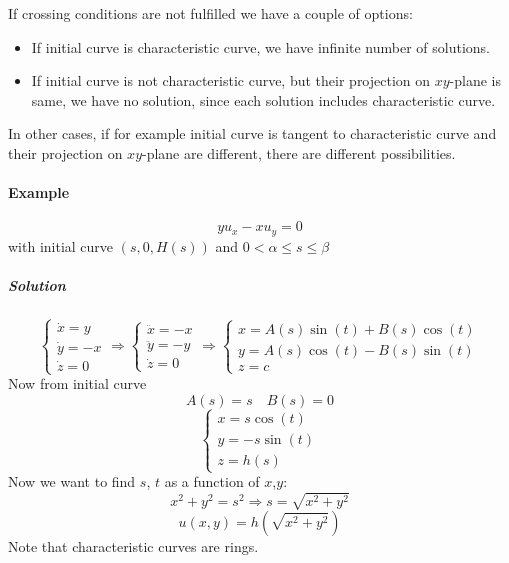 If crossing conditions are not fulfilled we have a couple of options:
\begin{itemize}
	\item If initial curve is characteristic curve, we have infinite number of solutions.
	\item If initial curve is not characteristic curve, but their projection on $xy$-plane is same, we have no solution, since each solution includes characteristic curve.
\end{itemize}

In other cases, if for example initial curve is tangent to characteristic curve and their projection on $xy$-plane are different, there are different possibilities.

\paragraph{Example}
$$yu_x - xu_y = 0$$
with initial curve $(s,0,H(s))$ and $0<\alpha\leq s\leq \beta$
\subparagraph{Solution}
$$\begin{cases}
\dot{x} = y\\
\dot{y} = -x\\
\dot{z} = 0
\end{cases} \Rightarrow \begin{cases}
\ddot{x} = -x\\
\ddot{y} = -y\\
\dot{z} = 0
\end{cases} \Rightarrow \begin{cases}
x = A(s)\sin(t)+B(s)\cos(t)\\
y = A(s)\cos(t)-B(s)\sin(t)\\
z = c
\end{cases}$$
Now from initial curve
$$A(s)= s \quad B(s) = 0$$
$$ \begin{cases}
x = s\cos(t)\\
y = -s\sin(t)\\
z = h(s)
\end{cases}$$
Now we want to find $s$, $t$ as a function of $x$,$y$:
$$x^2+y^2 = s^2 \Rightarrow s = \sqrt{x^2+y^2}$$
$$u(x,y)  = h\left(\sqrt{x^2+y^2}\right)$$
Note that characteristic curves are rings.

